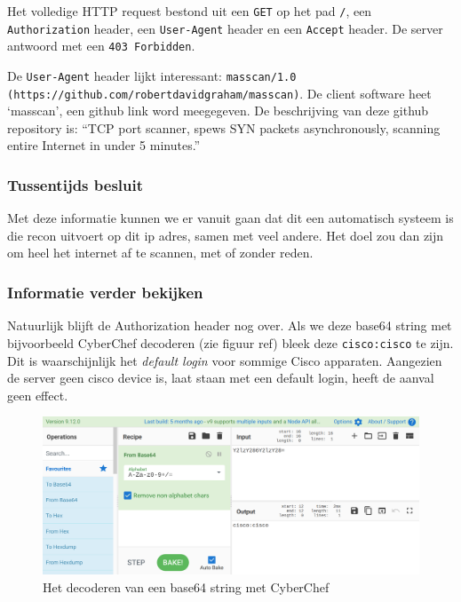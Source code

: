 \documentclass[a4paper,12pt]{report}
\begin{document}
Het volledige HTTP request bestond uit een \lstinline|GET| op het pad \lstinline|/|, een \lstinline|Authorization| header, een \lstinline|User-Agent| header en een \lstinline|Accept| header.
De server antwoord met een \lstinline|403 Forbidden|.

De \lstinline|User-Agent| header lijkt interessant: \lstinline|masscan/1.0 (https://github.com/robertdavidgraham/masscan)|.
De client software heet `masscan', een github link word meegegeven.
De beschrijving van deze github repository is: ``TCP port scanner, spews SYN packets asynchronously, scanning entire Internet in under 5 minutes.''

\subsubsection{Tussentijds besluit}
Met deze informatie kunnen we er vanuit gaan dat dit een automatisch systeem is die recon uitvoert op dit ip adres, samen met veel andere.
Het doel zou dan zijn om heel het internet af te scannen, met of zonder reden.

\subsubsection{Informatie verder bekijken}
Natuurlijk blijft de Authorization header nog over.
Als we deze base64 string met bijvoorbeeld CyberChef decoderen (zie figuur ref) bleek deze \lstinline|cisco:cisco| te zijn.
Dit is waarschijnlijk het \emph{default login} voor sommige Cisco apparaten.
Aangezien de server geen cisco device is, laat staan met een default login, heeft de aanval geen effect.

\begin{figure}[H]
  \centering
  \includegraphics[width=\textwidth]{analyse-masscan-cyberchef}
  \caption{Het decoderen van een base64 string met CyberChef}
  \label{fig:analyse-masscan-cyberchef}
\end{figure}
\end{document}
